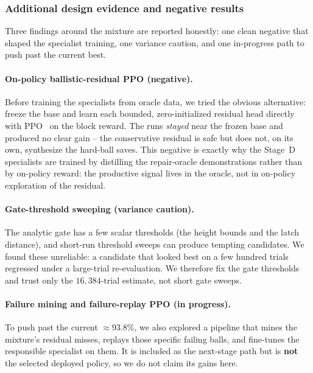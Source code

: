 \documentclass{article}
\begin{document}
\subsubsection{Additional design evidence and negative results}\label{sec:gk-secondary}

Three findings around the mixture are reported honestly: one clean negative that
shaped the specialist training, one variance caution, and one in-progress path to
push past the current best.

\paragraph{On-policy ballistic-residual PPO (negative).} Before training the
specialists from oracle data, we tried the obvious alternative: freeze the base
and learn each bounded, zero-initialized residual head directly with
PPO~\cite{ppo} on the block reward. The runs \emph{stayed} near the frozen base
and produced no clear gain -- the conservative residual is safe but does not, on
its own, synthesize the hard-ball saves. This negative is exactly why the
Stage~D specialists are trained by distilling the repair-oracle demonstrations
rather than by on-policy reward: the productive signal lives in the oracle, not
in on-policy exploration of the residual.

\paragraph{Gate-threshold sweeping (variance caution).} The analytic gate has a
few scalar thresholds (the height bounds and the latch distance), and short-run
threshold sweeps can produce tempting candidates.
We found these unreliable: a candidate that looked best on a few hundred trials
regressed under a large-trial re-evaluation. We therefore fix the gate thresholds
and trust only the $16{,}384$-trial estimate, not short gate sweeps.

\paragraph{Failure mining and failure-replay PPO (in progress).} To push past the
current $\approx 93.8\%$, we also explored a pipeline that mines the mixture's
residual misses, replays those specific failing balls, and fine-tunes the
responsible specialist on them. It is included as the next-stage path but is
\textbf{not} the selected deployed policy, so we do not claim its gains
here.
\end{document}
